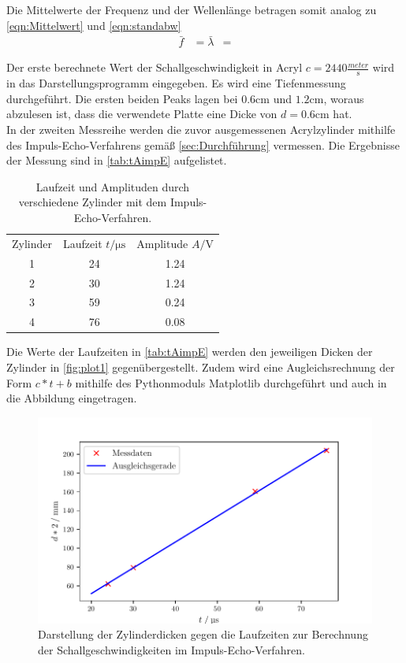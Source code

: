 Die Mittelwerte der Frequenz und der Wellenlänge betragen somit analog zu \autoref{eqn:Mittelwert} und \autoref{eqn:standabw} 
\begin{align*}
  \bar{f} &= 
  \bar{\lambda} &= 
\end{align*}

Der erste berechnete Wert der Schallgeschwindigkeit in Acryl $c=2440 \frac{\si{meter}}{\si{\second}}$ wird in das Darstellungsprogramm eingegeben.
Es wird eine Tiefenmessung durchgeführt. Die ersten beiden Peaks lagen bei $0.6 \si{\centi\meter}$ und $1.2 \si{\centi\meter}$, woraus abzulesen ist, dass die 
verwendete Platte eine Dicke von $d=0.6\si{\centi\meter}$ hat.\\

In der zweiten Messreihe werden die zuvor ausgemessenen Acrylzylinder mithilfe des Impuls-Echo-Verfahrens gemäß \autoref{sec:Durchführung} vermessen.
Die Ergebnisse der Messung sind in \autoref{tab:tAimpE} aufgelistet.
\begin{table}[H]
  \centering
  \caption{Laufzeit und Amplituden durch verschiedene Zylinder mit dem Impuls-Echo-Verfahren.}
  \label{tab:tAimpE}
  \begin{tabular}{S[table-format=1.0] S[table-format=2.0] S[table-format=1.2] }
  \toprule
  {Zylinder} & {Laufzeit $t / \si{\micro\second}$} &  {Amplitude $A / \si{\volt}$}\\
  1 &  24  & 1.24  \\
  2 &  30  & 1.24  \\
  3 &  59  & 0.24  \\
  4 &  76  & 0.08  \\
  \bottomrule
  \end{tabular}
\end{table}
Die Werte der Laufzeiten in \autoref{tab:tAimpE} werden den jeweiligen Dicken der Zylinder in \autoref{fig:plot1} gegenübergestellt.
Zudem wird eine Augleichsrechnung der Form $c*t+b$ mithilfe des Pythonmoduls Matplotlib \cite{matplotlib} durchgeführt und auch in die 
Abbildung eingetragen.
\begin{figure}[H]
  \centering
  \includegraphics{build/plot1.pdf}
  \caption {Darstellung der Zylinderdicken gegen die Laufzeiten zur Berechnung der Schallgeschwindigkeiten im Impuls-Echo-Verfahren.}
  \label{fig:plot1}
\end{figure}
